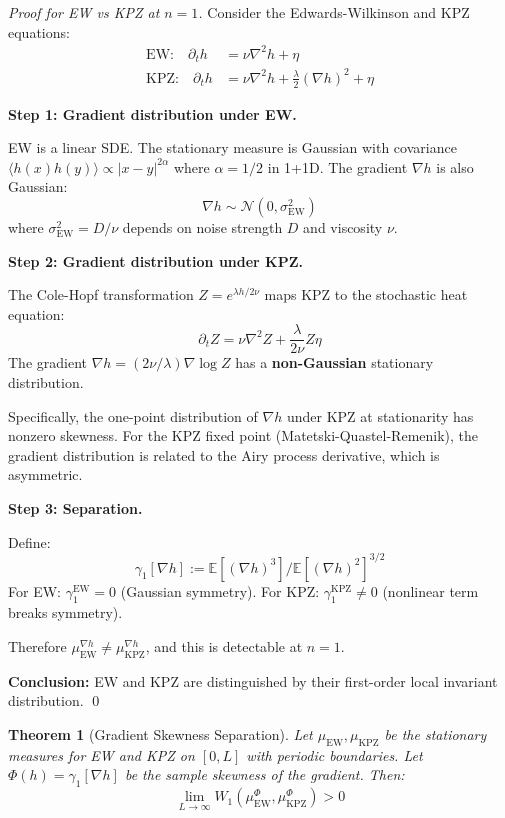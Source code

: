 \documentclass[11pt]{article}
\newtheorem{theorem}{Theorem}[section]
\newcommand{\E}{\mathbb{E}}
\begin{document}
\begin{proof}[Proof for EW vs KPZ at $n=1$]
Consider the Edwards-Wilkinson and KPZ equations:
\begin{align}
\text{EW:} \quad \partial_t h &= \nu \nabla^2 h + \eta \\
\text{KPZ:} \quad \partial_t h &= \nu \nabla^2 h + \frac{\lambda}{2}(\nabla h)^2 + \eta
\end{align}

\textbf{Step 1: Gradient distribution under EW.}

EW is a linear SDE. The stationary measure is Gaussian with covariance $\langle h(x)h(y)\rangle \propto |x-y|^{2\alpha}$ where $\alpha = 1/2$ in 1+1D. The gradient $\nabla h$ is also Gaussian:
\[
\nabla h \sim \mathcal{N}(0, \sigma^2_{\text{EW}})
\]
where $\sigma^2_{\text{EW}} = D/\nu$ depends on noise strength $D$ and viscosity $\nu$.

\textbf{Step 2: Gradient distribution under KPZ.}

The Cole-Hopf transformation $Z = e^{\lambda h / 2\nu}$ maps KPZ to the stochastic heat equation:
\[
\partial_t Z = \nu \nabla^2 Z + \frac{\lambda}{2\nu} Z \eta
\]
The gradient $\nabla h = (2\nu/\lambda) \nabla \log Z$ has a \textbf{non-Gaussian} stationary distribution. 

Specifically, the one-point distribution of $\nabla h$ under KPZ at stationarity has nonzero skewness. For the KPZ fixed point (Matetski-Quastel-Remenik), the gradient distribution is related to the Airy process derivative, which is asymmetric.

\textbf{Step 3: Separation.}

Define:
\[
\gamma_1[\nabla h] := \E[(\nabla h)^3] / \E[(\nabla h)^2]^{3/2}
\]
For EW: $\gamma_1^{\text{EW}} = 0$ (Gaussian symmetry). For KPZ: $\gamma_1^{\text{KPZ}} \neq 0$ (nonlinear term breaks symmetry).

Therefore $\mu_{\text{EW}}^{\nabla h} \neq \mu_{\text{KPZ}}^{\nabla h}$, and this is detectable at $n=1$.

\textbf{Conclusion:} EW and KPZ are distinguished by their first-order local invariant distribution. \qed
\end{proof}

\begin{theorem}[Gradient Skewness Separation]
\label{thm:gradient-skewness}
Let $\mu_{\text{EW}}, \mu_{\text{KPZ}}$ be the stationary measures for EW and KPZ on $[0,L]$ with periodic boundaries. Let $\Phi(h) = \gamma_1[\nabla h]$ be the sample skewness of the gradient. Then:
\[
\lim_{L \to \infty} W_1(\mu_{\text{EW}}^\Phi, \mu_{\text{KPZ}}^\Phi) > 0
\]
\end{theorem}
\end{document}
